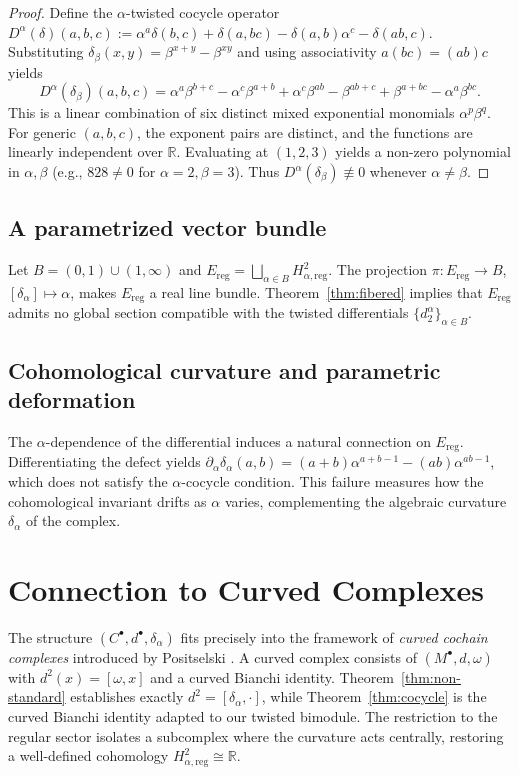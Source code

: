 \documentclass[11pt,a4paper]{article}
\theoremstyle{plain}
\theoremstyle{definition}
\theoremstyle{remark}
\newcommand{\RR}{\mathbb{R}}
\begin{document}
	\begin{proof}
		Define the $\alpha$-twisted cocycle operator $D^\alpha(\delta)(a,b,c) := \alpha^a \delta(b,c) + \delta(a,bc) - \delta(a,b)\alpha^c - \delta(ab,c)$. Substituting $\delta_\beta(x,y) = \beta^{x+y} - \beta^{xy}$ and using associativity $a(bc)=(ab)c$ yields
		\[
		D^\alpha(\delta_\beta)(a,b,c) = \alpha^a \beta^{b+c} - \alpha^c \beta^{a+b} + \alpha^c \beta^{ab} - \beta^{ab+c} + \beta^{a+bc} - \alpha^a \beta^{bc}.
		\]
		This is a linear combination of six distinct mixed exponential monomials $\alpha^p \beta^q$. For generic $(a,b,c)$, the exponent pairs are distinct, and the functions are linearly independent over $\RR$. Evaluating at $(1,2,3)$ yields a non-zero polynomial in $\alpha,\beta$ (e.g., $828 \neq 0$ for $\alpha=2,\beta=3$). Thus $D^\alpha(\delta_\beta) \not\equiv 0$ whenever $\alpha \neq \beta$.
	\end{proof}
	
	\subsection{A parametrized vector bundle}
	Let $B = (0,1) \cup (1,\infty)$ and $E_{\mathrm{reg}} = \bigsqcup_{\alpha \in B} H^2_{\alpha,\mathrm{reg}}$. The projection $\pi: E_{\mathrm{reg}} \to B$, $[\delta_\alpha] \mapsto \alpha$, makes $E_{\mathrm{reg}}$ a real line bundle. Theorem~\ref{thm:fibered} implies that $E_{\mathrm{reg}}$ admits no global section compatible with the twisted differentials $\{d^\alpha_2\}_{\alpha \in B}$.
	
	\subsection{Cohomological curvature and parametric deformation}
	The $\alpha$-dependence of the differential induces a natural connection on $E_{\mathrm{reg}}$. Differentiating the defect yields $\partial_\alpha \delta_\alpha(a,b) = (a+b)\alpha^{a+b-1} - (ab)\alpha^{ab-1}$, which does not satisfy the $\alpha$-cocycle condition. This failure measures how the cohomological invariant drifts as $\alpha$ varies, complementing the algebraic curvature $\delta_\alpha$ of the complex.
	
	\section{Connection to Curved Complexes}
	\label{sec:curved}
	The structure $(C^\bullet,d^\bullet,\delta_\alpha)$ fits precisely into the framework of \emph{curved cochain complexes} introduced by Positselski \cite{Positselski2011}. A curved complex consists of $(M^\bullet,d,\omega)$ with $d^2(x)=[\omega,x]$ and a curved Bianchi identity. Theorem~\ref{thm:non-standard} establishes exactly $d^2=[\delta_\alpha,\cdot]$, while Theorem~\ref{thm:cocycle} is the curved Bianchi identity adapted to our twisted bimodule. The restriction to the regular sector isolates a subcomplex where the curvature acts centrally, restoring a well-defined cohomology $H^2_{\alpha,\mathrm{reg}} \cong \RR$.
	
\end{document}
